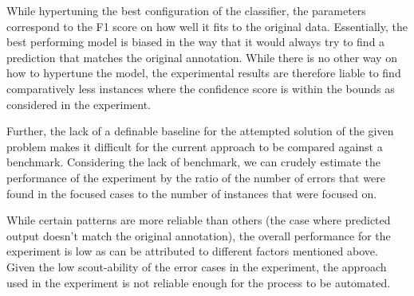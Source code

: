 While hypertuning the best configuration of the classifier, the parameters correspond to the F1 score on how well it fits to the original data. Essentially, the best performing model is biased in the way that it would always try to find a prediction that matches the original annotation. While there is no other way on how to hypertune the model, the experimental results are therefore liable to find comparatively less instances where the confidence score is within the bounds as considered in the experiment. 

Further, the lack of a definable baseline for the attempted solution of the given problem makes it difficult for the current approach to be compared against a benchmark. Considering the lack of benchmark, we can crudely estimate the performance of the experiment by the ratio of the number of errors that were found in the focused cases to the number of instances that were focused on. 

While certain patterns are more reliable than others (the case where predicted output doesn't match the original annotation), the overall performance for the experiment is low as can be attributed to different factors mentioned above. Given the low scout-ability of the error cases in the experiment, the approach used in the experiment is not reliable enough for the process to be automated.